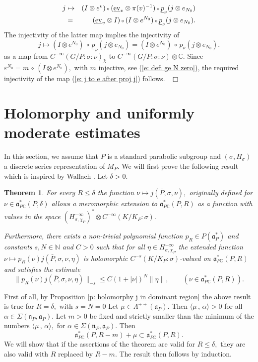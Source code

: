 \documentclass[12pt,a4paper]{article}
\newtheorem{Thm}{Theorem}
\newenvironment{thm}[0]{\begin{Thm}\noindent}%
{\end{Thm}}
\def\proof{\par\noindent{\it Proof.}{\ }{\ }}
\def\qed{~\hfill\hbox{$\Box$}\medbreak}
\def\qquad{\quad\quad}
\def\msy#1{{\mathbb #1}}
\def\C{{\msy C}}
\def\N{{\msy N}}
\def\ga{\alpha}
\def\gd{\delta}
\def\ge{\varepsilon}
\def\gs{\sigma}
\def\gS{\Sigma}
\def\got#1{\mathfrak #1}
\def\fa{{\got a}}
\def\fn{{\got n}}
\def\inp#1#2{\langle#1\,,\,#2\rangle}
\def\after{\,{\scriptstyle\circ}\,}
\def\iC{{\scriptscriptstyle \C}}
\numberwithin{Thm}{section}
\numberwithin{equation}{section}
\def\ev{{\rm ev}}
\def\faPdc{{\fa_{P\iC}^*}}
\def\faPd{{\fa_P^*}}
\def\gL{\Lambda}
\numberwithin{equation}{section}
\def\gL{\Lambda}
\def\faPdc{\fa_{P\iC}^*}
\def\faP{\fa_P}
\def\cchi{\chi}
\def\gsP{\gs}%
\begin{document}
\begin{eqnarray*}
j   & \mapsto  &  (I \otimes e^v) \after (\underline{\ev}_v  \otimes \pi(v)^{-1}) \after \underline p_{\nu} (j \otimes e_{N_0})\\
&=& (\underline\ev_v \otimes I) \after (I \otimes e^{N_0}) \after \underline p_{\nu} (j \otimes e_{N_0}).
\end{eqnarray*}
The injectivity of the latter map implies the injectivity of 
$$ 
j \mapsto (I \otimes e^{N_0}) \after \underline p_{\nu }(j\otimes e_{N_0})
=
(I \otimes e^{N_0}) \after p_{\nu }(j\otimes e_{N_0}).
$$ 
as a map from $C^{-\infty}(G/P:\gs : \nu)_\cchi $ to $C^{-\infty} (G/P: \gs:\nu) \otimes \C$.
Since $\ge^{N_0} = m \after (I \otimes e^{N_0}),$ with $m$ injective, 
see (\ref{e: defi ge N zero}), the required injectivity of the map (\ref{e: j to e after proj j}) 
follows.
\qed

%
\section{Holomorphy and uniformly moderate estimates}
\label{s: holo and ume}
In this section, we assume that
$P$ is a standard parabolic subgroup and $(\gs, H_\gs)$ a discrete series representation of $M_P.$ 
We will first prove the following result which is inspired by Wallach \cite[Thm. 15.4]{Wrrg2}.
Let $\gd > 0.$ 


\begin{thm}
\label{t: estimate by functional equation}
For every $R \leq \gd$ the function $\nu \mapsto j(\bar P,\gs, \nu),$ originally defined for $\nu \in \faPdc(P,\gd)$ 
allows a meromorphic extension to $\faPdc(P,R)$ as a function with values in the space
$(H_{\gs,\cchi_P}^{-\infty})^* \otimes C^{-\infty}(K/K_P:\gsP).$ 

Furthermore, there exists a non-trivial polynomial function $p_R \in P(\faPd)$ and constants $s, N \in \N$
and $C > 0$ such that for all $\eta \in H_{\gs,\cchi_P}^{-\infty}$ the extended function $\nu \mapsto 
p_R(\nu) j(\bar P, \gs, \nu,\eta)$ is holomorphic $C^{-s}(K/K_P: \gsP)$-valued on $\faPdc(P,R)$ 
and satisfies the estimate
$$ 
\|p_R(\nu) j(\bar P,\gs, \nu, \eta)\|_{-s} \leq C (1 + |\nu|)^N \|\eta\|, \qquad (\nu \in \faPdc(P,R)).
$$ 
\end{thm}

\proof 
First of all, by Proposition \ref{p: holomorphy j in dominant region} 
the above result is true for $R = \gd,$ with $s = N=0$   Let $\mu \in \gL^{++}(\faP).$ Then $\inp{\mu}{\ga} > 0$ for all $\ga \in \gS(\fn_P, \faP).$  Let $m>0$ be fixed and strictly smaller than the minimum of the numbers
$\inp{\mu}{\ga},$ for $\ga \in \gS(\fn_P, \faP).$ Then 
$$ 
\faPdc(P, R-m) + \mu \subset \faPdc(P,R). 
$$ 
We will show that if the assertions of the theorem are valid for $R \leq \gd,$ 
they are also valid with $R$ replaced by $R - m.$ The result then follows by 
induction.
\end{document}
